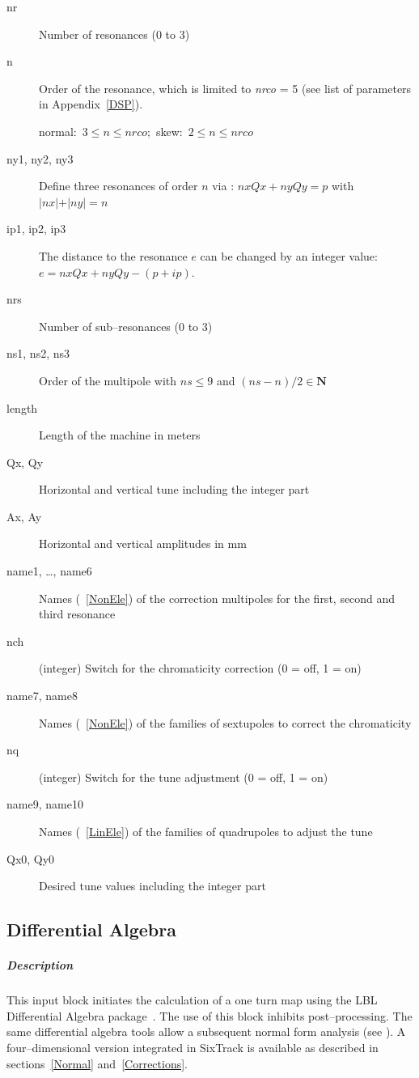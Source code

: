 \begin{description}
\item [nr] Number of resonances (0 to 3)
\item [n] Order of the resonance, which is limited to {\em nrco} \/= 5
  (see list of parameters in Appendix~\ref{DSP}).
  
  \mbox{normal: $ 3 \le n \le nrco $; skew: $ 2 \le n \le nrco $}
\item [ny1, ny2, ny3] Define three resonances of order $n$ via :
  \mbox{$ nx Qx + ny Qy = p $} with \mbox{$ \vert nx \vert + \vert ny
    \vert = n $}
\item [ip1, ip2, ip3] The distance to the resonance $ e $ can be
  changed by an integer value: \newline \mbox{$ e = nx Qx + ny Qy -
    (p+ip) $.}
\item [nrs] Number of sub--resonances (0 to 3)
\item [ns1, ns2, ns3] Order of the multipole with \mbox{$ ns \le 9 $}
  and \mbox{$ (ns-n)/2 \in {\mathbf N} $}
\item [length] Length of the machine in meters
\item [Qx, Qy] Horizontal and vertical tune including the integer part
\item [Ax, Ay] Horizontal and vertical amplitudes in mm
\item [name1, \dots, name6] Names (~\ref{NonEle}) of the correction
  multipoles for the first, second and third resonance
\item [nch] (integer) Switch for the chromaticity correction (0 = off,
  1 = on)
\item [name7, name8] Names (~\ref{NonEle}) of the families of
  sextupoles to correct the chromaticity
\item [nq] (integer) Switch for the tune adjustment (0 = off, 1 = on)
\item [name9, name10] Names (~\ref{LinEle}) of the families of
  quadrupoles to adjust the tune
\item [Qx0, Qy0] Desired tune values including the integer part
\end{description}

\subsection{Differential Algebra} \label{DifAlg}

\subparagraph{Description} This input block initiates the calculation
of a one turn map using the LBL Differential Algebra
package~\cite{DALIE}.  The use of this block inhibits
post--processing. The same differential algebra tools allow a
subsequent normal form analysis (see \cite{Forest89}).  A
four--dimensional version integrated in SixTrack is available as
described in sections~\ref{Normal} and~\ref{Corrections}.

